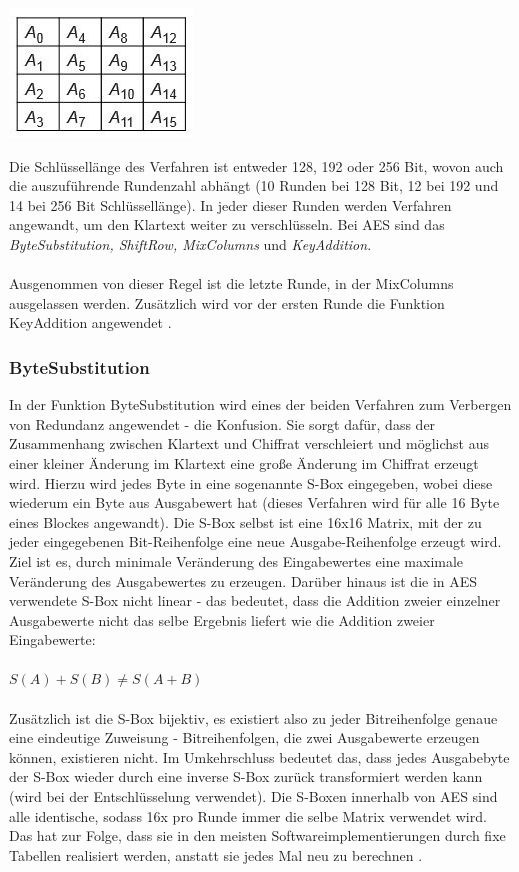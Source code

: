 \documentclass[10pt, a4paper,headsepline]{scrreprt}
\begin{document}
\includegraphics[scale=0.5]{aes_state.JPG} 
\hfill

Die Schlüssellänge des Verfahren ist entweder 128, 192 oder 256 Bit, wovon auch die auszuführende Rundenzahl abhängt (10 Runden bei 128 Bit, 12 bei 192 und 14 bei 256 Bit Schlüssellänge). In jeder dieser Runden werden Verfahren angewandt, um den Klartext weiter zu verschlüsseln. Bei AES sind das \textit{ByteSubstitution, ShiftRow, MixColumns} und \textit{KeyAddition}. \\ \\
Ausgenommen von dieser Regel ist die letzte Runde, in der MixColumns ausgelassen werden. %
Zusätzlich wird vor der ersten Runde die Funktion KeyAddition angewendet \citep[S. 89ff]{book:understanding-crypto}.

\subsubsection{ByteSubstitution}
In der Funktion ByteSubstitution wird eines der beiden Verfahren zum Verbergen von Redundanz angewendet - die Konfusion. Sie sorgt dafür, dass der Zusammenhang zwischen Klartext und Chiffrat verschleiert und möglichst aus einer kleiner Änderung im Klartext eine große Änderung im Chiffrat erzeugt wird. Hierzu wird jedes Byte in eine sogenannte S-Box eingegeben, wobei diese  wiederum ein Byte aus Ausgabewert hat (dieses Verfahren wird für alle 16 Byte eines Blockes angewandt). Die S-Box selbst ist eine 16x16 Matrix, mit der zu jeder eingegebenen Bit-Reihenfolge eine neue Ausgabe-Reihenfolge erzeugt wird. Ziel ist es, durch minimale Veränderung des Eingabewertes eine maximale Veränderung des Ausgabewertes zu erzeugen. Darüber hinaus ist die in AES verwendete S-Box nicht linear - das bedeutet, dass die Addition zweier einzelner Ausgabewerte nicht das selbe Ergebnis liefert wie die Addition zweier Eingabewerte:\\ \\
\(S(A) + S(B) \neq S(A+B)\) \\ \\
Zusätzlich ist die S-Box bijektiv, es existiert also zu jeder Bitreihenfolge genaue eine eindeutige Zuweisung - Bitreihenfolgen, die zwei Ausgabewerte erzeugen können, existieren nicht. Im Umkehrschluss bedeutet das, dass jedes Ausgabebyte der S-Box wieder durch eine inverse S-Box zurück transformiert werden kann (wird bei der Entschlüsselung verwendet). Die S-Boxen innerhalb von AES sind alle identische, sodass 16x pro Runde immer die selbe Matrix verwendet wird. Das hat zur Folge, dass sie in den meisten Softwareimplementierungen durch fixe Tabellen realisiert werden, anstatt sie jedes Mal neu zu berechnen \citep[S. 101ff]{book:understanding-crypto}.
\end{document}
